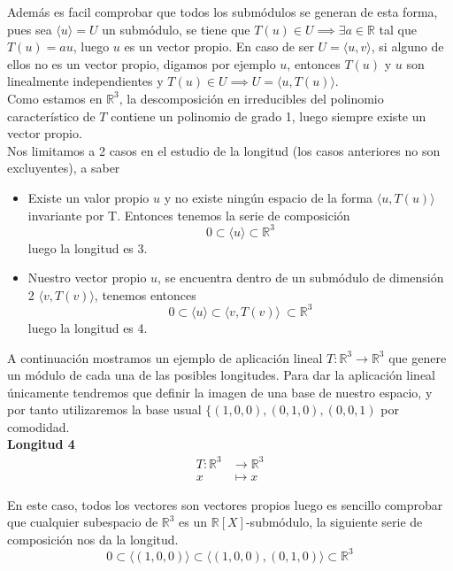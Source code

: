 Además es facil comprobar que todos los submódulos se generan de
esta forma, pues sea \(\langle u \rangle = U\) un submódulo, se tiene que \(T(u)
\in U \implies \exists a \in \mathbb{R}\) tal que \(T(u) = au\), luego \(u\) es un
vector propio. En caso de ser \(U = \langle u , v \rangle\), si alguno de ellos
no es un vector propio, digamos por ejemplo \(u\), entonces \(T(u)\) y \(u\) son linealmente independientes y
\(T(u) \in U \implies U = \langle u , T(u) \rangle\).\\

Como estamos en \(\mathbb{R}^3\), la descomposición en irreducibles del
polinomio característico de \(T\) contiene un polinomio de grado 1, luego
siempre existe un vector propio.\\

Nos limitamos a 2 casos en el estudio de la longitud (los casos
anteriores no son excluyentes), a saber
\begin{itemize}
\item Existe un valor propio \(u\) y no existe ningún espacio de la forma
  \(\langle u, T(u)\rangle \) invariante por T. Entonces tenemos la serie de composición
  \[
    0 \subset \langle u \rangle \subset \mathbb{R}^3
  \]
  luego la longitud es 3.
\item Nuestro vector propio \(u\), se encuentra dentro de un submódulo de
  dimensión 2 \(\langle v, T(v) \rangle\), tenemos entonces
  \[
    0 \subset \langle u \rangle \subset \langle v, T(v) \rangle\ \subset \mathbb{R}^3
  \]
  luego la longitud es 4.
\end{itemize}

A continuación mostramos un ejemplo de aplicación lineal \(T:\mathbb{R}^3 \rightarrow \mathbb{R}^3\) que genere un módulo de cada una de las posibles longitudes.
Para dar la aplicación lineal únicamente tendremos que definir la imagen de una base de nuestro espacio, y por tanto utilizaremos la base usual
\(\{(1,0,0), (0,1,0), (0,0,1)\) por comodidad.\\

\textbf{Longitud 4}%
\[
\begin{aligned}
  T:\mathbb{R}^3 &\rightarrow \mathbb{R}^3\\
  x &\mapsto x
\end{aligned}
\]

En este caso, todos los vectores son vectores propios luego es sencillo comprobar que cualquier subespacio de \(\mathbb{R}^3\) es un
\(\mathbb{R}[X]\)-submódulo, la siguiente serie de composición nos da la longitud.
\[
        0 \subset \langle (1,0,0) \rangle \subset \langle (1,0,0), (0,1,0)
        \rangle \subset \mathbb{R}^3
\]

